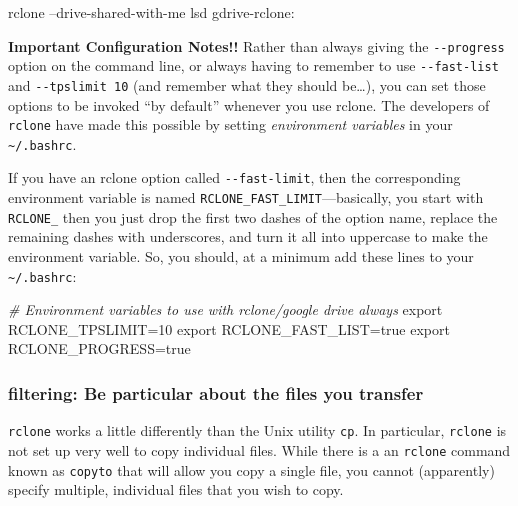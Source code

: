 \documentclass[]{krantz}
\makeatletter
\newenvironment{Shaded}{\begin{snugshade}}{\end{snugshade}}
\newcommand{\BuiltInTok}[1]{#1}
\newcommand{\CommentTok}[1]{\textcolor[rgb]{0.37,0.37,0.37}{\textit{#1}}}
\newcommand{\ExtensionTok}[1]{#1}
\newcommand{\NormalTok}[1]{#1}
\newcommand{\VariableTok}[1]{\textcolor[rgb]{0,0,0}{#1}}
\newenvironment{kframe}{%
\medskip{}
\setlength{\fboxsep}{.8em}
 \def\at@end@of@kframe{}%
 \ifinner\ifhmode%
  \def\at@end@of@kframe{\end{minipage}}%
  \begin{minipage}{\columnwidth}%
 \fi\fi%
 \def\FrameCommand##1{\hskip\@totalleftmargin \hskip-\fboxsep
 \colorbox{shadecolor}{##1}\hskip-\fboxsep
     \hskip-\linewidth \hskip-\@totalleftmargin \hskip\columnwidth}%
 \MakeFramed {\advance\hsize-\width
   \@totalleftmargin\z@ \linewidth\hsize
   \@setminipage}}%
 {\par\unskip\endMakeFramed%
 \at@end@of@kframe}
\renewenvironment{Shaded}{\begin{kframe}}{\end{kframe}}
\makeatother
\begin{document}
\begin{Shaded}
\begin{Highlighting}[]
\ExtensionTok{rclone}\NormalTok{ --drive-shared-with-me lsd gdrive-rclone:}
\end{Highlighting}
\end{Shaded}

\textbf{Important Configuration Notes!!} Rather than always giving the \texttt{-\/-progress}
option on the command line, or always having to remember to use
\texttt{-\/-fast-list} and \texttt{-\/-tpslimit\ 10} (and remember what they should be\ldots{}),
you can set those options to be invoked ``by default'' whenever you use
rclone. The developers of \texttt{rclone} have made this possible
by setting \emph{environment variables} in your \texttt{\textasciitilde{}/.bashrc}.

If you have an rclone option called \texttt{-\/-fast-limit}, then the corresponding
environment variable is named \texttt{RCLONE\_FAST\_LIMIT}---basically, you
start with \texttt{RCLONE\_} then you just
drop the first two dashes of the option name, replace the remaining dashes
with underscores, and turn it all into uppercase to make the
environment variable. So, you should, at a minimum add these
lines to your \texttt{\textasciitilde{}/.bashrc}:

\begin{Shaded}
\begin{Highlighting}[]
\CommentTok{# Environment variables to use with rclone/google drive always}
\BuiltInTok{export} \VariableTok{RCLONE_TPSLIMIT=}\NormalTok{10}
\BuiltInTok{export} \VariableTok{RCLONE_FAST_LIST=}\NormalTok{true}
\BuiltInTok{export} \VariableTok{RCLONE_PROGRESS=}\NormalTok{true}
\end{Highlighting}
\end{Shaded}

\hypertarget{rclone-filter}{%
\subsubsection{filtering: Be particular about the files you transfer}\label{rclone-filter}}

\texttt{rclone} works a little differently than the Unix utility \texttt{cp}. In particular,
\texttt{rclone} is not set up very well to copy individual files. While there is a
an \texttt{rclone} command known as \texttt{copyto} that will allow you copy a single file,
you cannot (apparently) specify multiple, individual files that you wish to copy.
\end{document}
